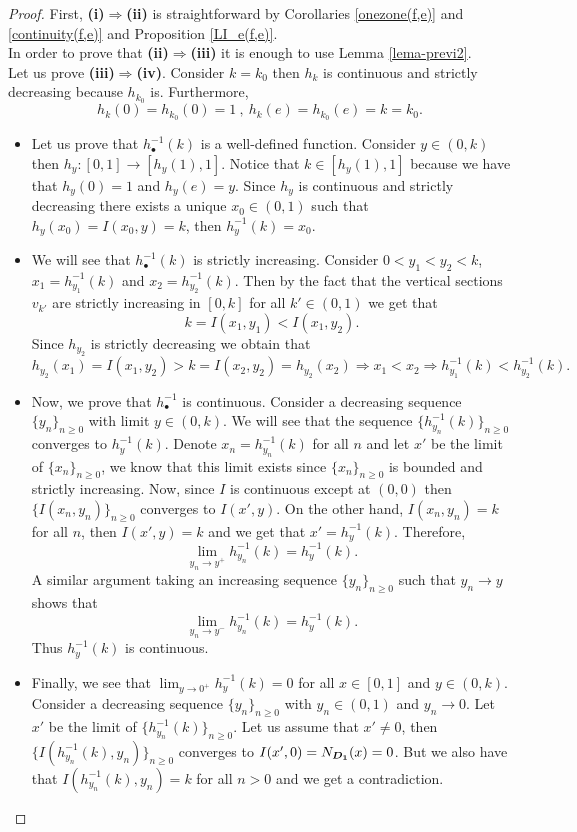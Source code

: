 \begin{proof}
	First, {\bf (i)$\Rightarrow$(ii)} is straightforward by Corollaries \ref{onezone(f,e)} and \ref{continuity(f,e)}  and Proposition \ref{LI_e(f,e)}.\\
	In order to prove that {\bf (ii)$\Rightarrow$(iii)} it is enough to use Lemma \ref{lema-previ2}.\\
	Let us prove {\bf(iii)$\Rightarrow$(iv)}. Consider $k=k_0$ then $h_k$ is continuous and strictly decreasing because $h_{k_0}$ is. Furthermore,
	$$h_k(0)=h_{k_0}(0)=1 ~,~ h_k(e)=h_{k_0}(e)=k=k_0.$$
	\begin{itemize}
		\item Let us prove that $h_{\bullet}^{-1}(k)$ is a well-defined function. Consider $y \in (0,k)$ then $h_y : [0,1] \to [h_y(1),1]$. Notice that $k\in [h_y(1),1]$ because we have that $h_y(0)=1$ and $h_y(e)=y$. Since $h_y$ is continuous and strictly decreasing there exists a unique $x_0 \in (0,1)$ such that $h_y(x_0)=I(x_0,y)=k$, then $h_y^{-1}(k)=x_0$.
		\item We will see that $h_{\bullet}^{-1}(k)$ is strictly increasing. Consider $0<y_1<y_2<k$, $x_1=h_{y_1}^{-1}(k)$ and $x_2=h_{y_2}^{-1}(k)$. Then by the fact that the vertical sections $v_{k'}$ are strictly increasing in $[0,k]$ for all $k' \in (0,1)$ we get that
		$$k=I(x_1,y_1)<I(x_1,y_2).$$
		Since $h_{y_2}$ is strictly decreasing we obtain that
		$$h_{y_2}(x_1)=I(x_1,y_2)>k = I(x_2,y_2)=h_{y_2}(x_2) \Rightarrow x_1 < x_2 \Rightarrow h_{y_1}^{-1}(k) < h_{y_2}^{-1}(k).$$
		\item Now, we prove that $h^{-1}_{\bullet}$ is continuous. Consider a decreasing sequence $\{y_n\}_{n \geq 0}$ with limit $y \in (0,k)$. We will see that the sequence $\{h^{-1}_{y_n}(k)\}_{n \geq 0}$ converges to $h_{y}^{-1}(k)$. Denote $x_n=h^{-1}_{y_n}(k)$ for all $n$ and let $x'$ be the limit of  $\{x_n\}_{n \geq 0}$, we know that this limit exists since $\{x_n\}_{n \geq 0}$ is bounded and strictly increasing. Now, since $I$ is continuous except at $(0,0)$ then $\{I(x_n,y_n)\}_{ n \geq 0}$ converges to $I(x',y)$. On the other hand, $I(x_n,y_n)=k$ for all $n$, then $I(x',y)=k$ and we get that $x' = h_y^{-1}(k)$. Therefore,
		$$\lim_{y_n \to y^{+}} h_{y_n}^{-1}(k)=h_y^{-1}(k).$$
		A similar argument taking an increasing sequence $\{y_n\}_{n \geq 0}$ such that $y_n \to y$ shows that
		$$ \lim_{y_n \to y^{-}} h_{y_n}^{-1}(k) =h_y^{-1}(k).$$
		Thus $h_y^{-1}(k)$ is continuous.
		\item Finally, we see that $\displaystyle \lim_{y \to 0^{+}} h_y^{-1}(k)=0$ for all $x \in [0,1]$ and $y \in (0,k)$. Consider a decreasing sequence $\{y_n\}_{n \geq 0}$ with $y_n \in (0,1)$ and $y_n \to 0$. Let $x'$ be the limit of $\{h_{y_n}^{-1}(k)\}_{n \geq 0}$. Let us assume that $x' \not = 0$, then $\{ I(h_{y_n}^{-1}(k),y_n) \}_{n \geq 0}$ converges to $I(x',0) = N_{\bm{D_1}}(x)=0$. But we also have that $I(h^{-1}_{y_n}(k),y_n)=k$ for all $n>0$ and we get a contradiction.

\end{itemize}
\end{proof}
